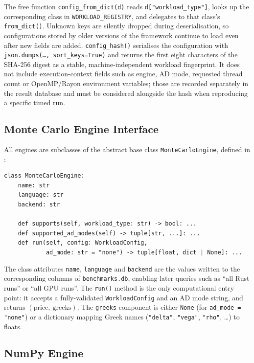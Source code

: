 The free function \texttt{config\_from\_dict(d)} reads \texttt{d["workload\_type"]},
looks up the corresponding class in \texttt{WORKLOAD\_REGISTRY}, and delegates
to that class's \texttt{from\_dict()}. Unknown keys are silently dropped during
deserialisation, so configurations stored by older versions of the framework
continue to load even after new fields are added. \texttt{config\_hash()}
serialises the configuration with \texttt{json.dumps(\dots, sort\_keys=True)}
and returns the first eight characters of the SHA-256 digest as a stable,
machine-independent workload fingerprint. It does not include execution-context
fields such as engine, AD mode, requested thread count or OpenMP/Rayon
environment variables; those are recorded separately in the result database and
must be considered alongside the hash when reproducing a specific timed run.

\subsection{Monte Carlo Engine Interface}
\label{sec:impl-engine-interface}

All engines are subclasses of the abstract base class
\texttt{MonteCarloEngine}, defined in :

\begin{verbatim}
class MonteCarloEngine:
    name: str
    language: str
    backend: str

    def supports(self, workload_type: str) -> bool: ...
    def supported_ad_modes(self) -> tuple[str, ...]: ...
    def run(self, config: WorkloadConfig,
            ad_mode: str = "none") -> tuple[float, dict | None]: ...
\end{verbatim}

The class attributes \texttt{name}, \texttt{language} and \texttt{backend} are
the values written to the corresponding columns of \texttt{benchmarks.db},
enabling later queries such as ``all Rust runs'' or ``all GPU runs''. The
\texttt{run()} method is the only computational entry point: it accepts a
fully-validated \texttt{WorkloadConfig} and an AD mode string, and returns
$(\text{price},\ \text{greeks})$. The \texttt{greeks} component is either
\texttt{None} (for \texttt{ad\_mode = "none"}) or a dictionary mapping Greek
names (\texttt{"delta"}, \texttt{"vega"}, \texttt{"rho"}, \ldots) to floats.

\subsection{NumPy Engine}
\label{sec:impl-numpy}

